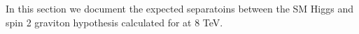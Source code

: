 In this section we document the expected separatoins between 
the SM Higgs and spin 2 graviton hypothesis calculated for \intlumiEightTeV 
at 8 TeV. 
